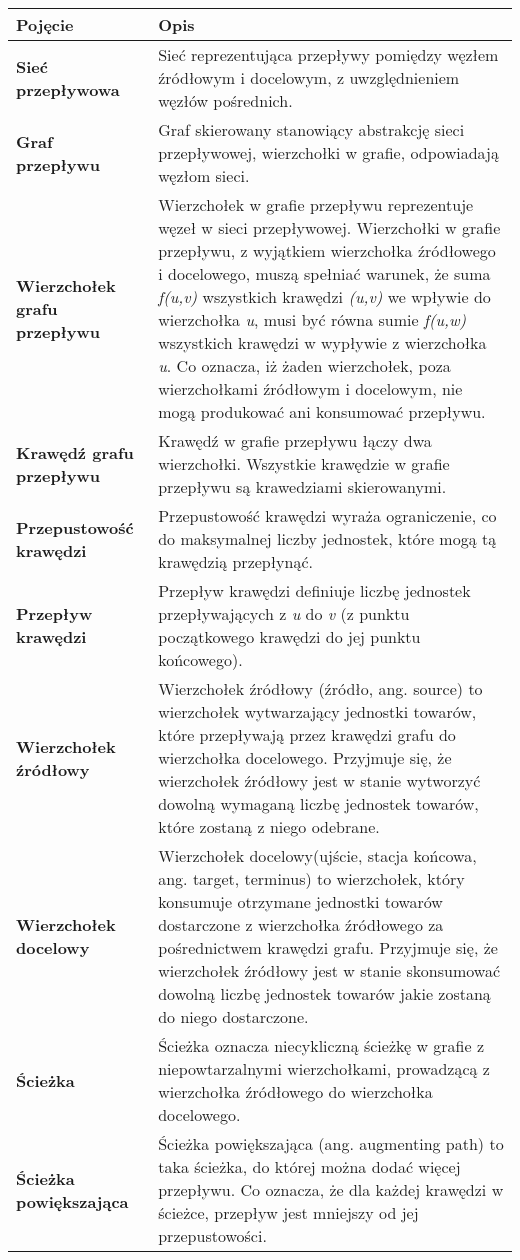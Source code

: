 \documentclass[10pt]{dokument-tiwo}
\begin{document}
\begin{longtable}{@{} >{\bfseries}p{} @{\hspace{0.02\textwidth}} p{} @{}}
\toprule
Pojęcie & \bfseries{Opis}\\
\toprule
Sieć przepływowa  &
Sieć reprezentująca przepływy pomiędzy węzłem źródłowym i docelowym, z uwzględnieniem węzłów pośrednich.\\
\midrule
Graf przepływu &
Graf skierowany stanowiący abstrakcję sieci przepływowej, wierzchołki w grafie, odpowiadają węzłom sieci.\\
\midrule
Wierzchołek grafu przepływu &
Wierzchołek w grafie przepływu reprezentuje węzeł w sieci przepływowej. Wierzchołki w grafie przepływu, z wyjątkiem wierzchołka źródłowego
i docelowego, muszą spełniać warunek, że suma \emph{f(u,v)} wszystkich krawędzi \emph{(u,v)} we wpływie do wierzchołka
\emph{u}, musi być równa sumie \emph{f(u,w)} wszystkich krawędzi w wypływie z wierzchołka \emph{u}. Co oznacza, iż żaden wierzchołek, poza wierzchołkami
źródłowym i docelowym, nie mogą produkować ani konsumować przepływu.\\
\midrule
Krawędź grafu przepływu &
Krawędź w grafie przepływu łączy dwa wierzchołki. Wszystkie krawędzie w grafie przepływu są krawedziami skierowanymi.\\
\midrule
Przepustowość krawędzi &
Przepustowość krawędzi wyraża ograniczenie, co do maksymalnej liczby jednostek, które mogą tą krawędzią przepłynąć.\\
\midrule
Przepływ krawędzi &
Przepływ krawędzi definiuje liczbę jednostek przepływających z \emph{u} do \emph{v} (z punktu początkowego krawędzi do jej punktu końcowego).\\
\midrule
Wierzchołek źródłowy &
Wierzchołek źródłowy (źródło, ang. source) to wierzchołek wytwarzający jednostki towarów, które przepływają przez krawędzi grafu do wierzchołka
docelowego. Przyjmuje się, że wierzchołek źródłowy jest w stanie wytworzyć dowolną wymaganą liczbę jednostek towarów, które zostaną z niego odebrane.\\
\midrule
Wierzchołek docelowy &
Wierzchołek docelowy(ujście, stacja końcowa, ang. target, terminus) to wierzchołek, który konsumuje otrzymane jednostki towarów dostarczone z wierzchołka
źródłowego za pośrednictwem krawędzi grafu. Przyjmuje się, że wierzchołek źródłowy jest w stanie skonsumować dowolną liczbę jednostek towarów jakie zostaną
do niego dostarczone.\\
\midrule
Ścieżka &
Ścieżka oznacza niecykliczną ścieżkę w grafie z niepowtarzalnymi wierzchołkami, prowadzącą z wierzchołka źródłowego do wierzchołka docelowego.\\
\midrule
Ścieżka powiększająca &
Ścieżka powiększająca (ang. augmenting path) to taka ścieżka, do której można dodać więcej przepływu. Co oznacza, że dla każdej krawędzi w ścieżce,
przepływ jest mniejszy od jej przepustowości.\\
\bottomrule
\end{longtable}
\end{document}
